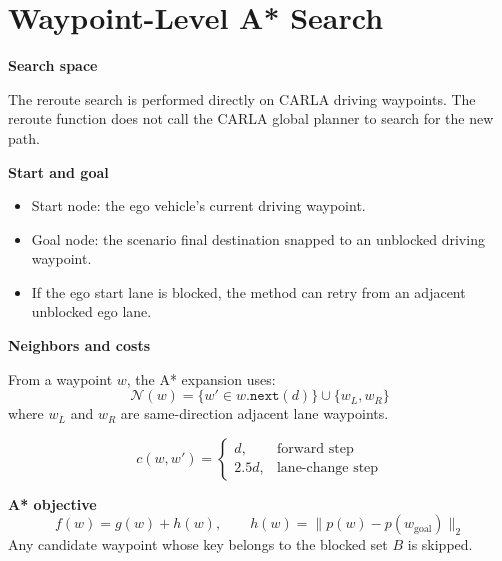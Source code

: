 \documentclass[11pt]{article}
\begin{document}
\section*{Waypoint-Level A* Search}
\begin{minipage}[t]{0.59\textwidth}
\textbf{Search space}

The reroute search is performed directly on CARLA driving waypoints. The reroute function does not call the CARLA global planner to search for the new path.

\textbf{Start and goal}
\begin{itemize}
\setlength\itemsep{0.3em}
\item Start node: the ego vehicle's current driving waypoint.
\item Goal node: the scenario final destination snapped to an unblocked driving waypoint.
\item If the ego start lane is blocked, the method can retry from an adjacent unblocked ego lane.
\end{itemize}

\textbf{Neighbors and costs}

From a waypoint \(w\), the A* expansion uses:
\[
\mathcal{N}(w)=\{w'\in w.\texttt{next}(d)\}\cup\{w_L,w_R\}
\]
where \(w_L\) and \(w_R\) are same-direction adjacent lane waypoints.

\[
c(w,w')=
\begin{cases}
d, & \text{forward step}\\[0.3em]
2.5d, & \text{lane-change step}
\end{cases}
\]

\textbf{A* objective}
\[
f(w)=g(w)+h(w), \qquad
h(w)=\|p(w)-p(w_{\mathrm{goal}})\|_2
\]
Any candidate waypoint whose key belongs to the blocked set \(B\) is skipped.
\end{minipage}
\hfill
\end{document}
